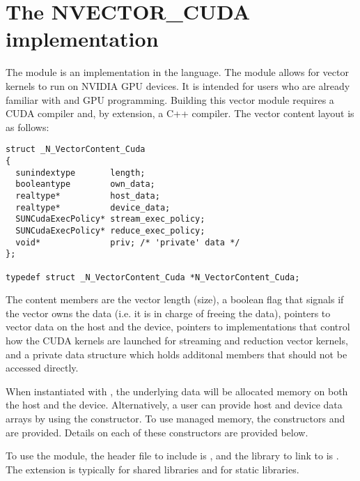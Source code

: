 %
\section{The NVECTOR\_CUDA implementation}\label{ss:nvec_cuda}

The {\nveccuda} module is an {\nvector} implementation in the {\cuda} language.
The module allows for {\sundials} vector kernels to run on NVIDIA GPU devices. It is intended
for users who are already familiar with {\cuda} and GPU programming. Building this vector
module requires a CUDA compiler and, by extension, a C++ compiler. The vector content layout
is as follows:

\begin{verbatim}
struct _N_VectorContent_Cuda 
{
  sunindextype       length;
  booleantype        own_data;
  realtype*          host_data;
  realtype*          device_data;
  SUNCudaExecPolicy* stream_exec_policy;
  SUNCudaExecPolicy* reduce_exec_policy;
  void*              priv; /* 'private' data */
};

typedef struct _N_VectorContent_Cuda *N_VectorContent_Cuda;
\end{verbatim}

The content members are the vector length (size), a boolean flag that signals if 
the vector owns the data (i.e. it is in charge of freeing the data), pointers to
vector data on the host and the device, pointers to 
implementations that control how the CUDA kernels are launched for streaming and 
reduction vector kernels, and a private data structure which holds additonal members
that should not be accessed directly.

When instantiated with , the underlying data will be allocated
memory on both the host and the device. Alternatively, a user can provide host
and device data arrays by using the  constructor. To use {\cuda}
managed memory, the constructors  and \newline
{} are provided. Details on each of these constructors
are provided below.

To use the {\nveccuda} module, the header file to include is ,
and the library to link to is . The
extension  is typically  for shared libraries and 
for static libraries.

